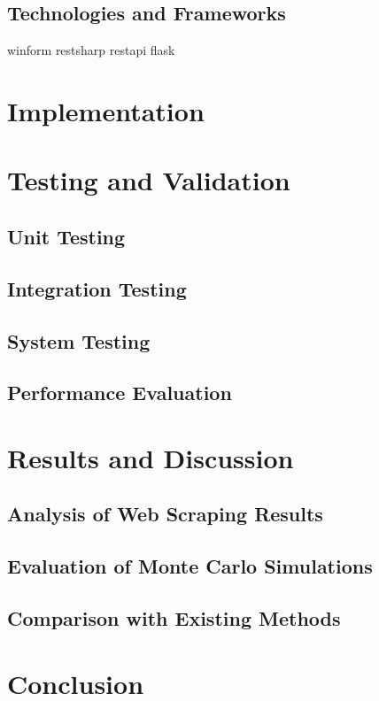 \documentclass{thesis-ekf}
\theoremstyle{definition}
\theoremstyle{remark}
\begin{document}
\section{Technologies and Frameworks}
winform
restsharp
restapi
flask








\chapter{Implementation}

\chapter{Testing and Validation}
\section{Unit Testing}
\section{Integration Testing}
\section{System Testing}
\section{Performance Evaluation}

\chapter{Results and Discussion}
\section{Analysis of Web Scraping Results}
\section{Evaluation of Monte Carlo Simulations}
\section{Comparison with Existing Methods}

\chapter{Conclusion}
\end{document}
